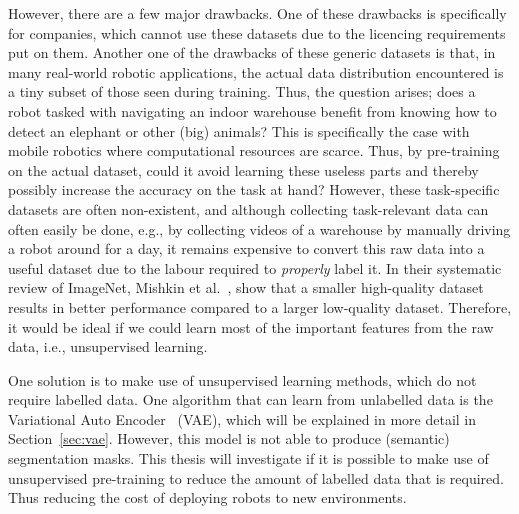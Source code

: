 However, there are a few major drawbacks. One of these drawbacks is specifically for companies, which cannot use these datasets due to the licencing requirements put on them. Another one of the drawbacks of these generic datasets is that, in many real-world robotic applications, the actual data distribution encountered is a tiny subset of those seen during training. Thus, the question arises; does a robot tasked with navigating an indoor warehouse benefit from knowing how to detect an elephant or other (big) animals? This is specifically the case with mobile robotics where computational resources are scarce. Thus, by pre-training on the actual dataset, could it avoid learning these useless parts and thereby possibly increase the accuracy on the task at hand? However, these task-specific datasets are often non-existent, and although collecting task-relevant data can often easily be done, e.g., by collecting videos of a warehouse by manually driving a robot around for a day, it remains expensive to convert this raw data into a useful dataset due to the labour required to \emph{properly} label it. In their systematic review of ImageNet, Mishkin et al.~\cite{MISHKIN201711}, show that a smaller high-quality dataset results in better performance compared to a larger low-quality dataset. Therefore, it would be ideal if we could learn most of the important features from the raw data, i.e., unsupervised learning.

One solution is to make use of unsupervised learning methods, which do not require labelled data. One algorithm that can learn from unlabelled data is the Variational Auto Encoder~\cite{kingma2014autoencodingvariationalbayes} (VAE), which will be explained in more detail in Section~\ref{sec:vae}. However, this model is not able to produce (semantic) segmentation masks. This thesis will investigate if it is possible to make use of unsupervised pre-training to reduce the amount of labelled data that is required. Thus reducing the cost of deploying robots to new environments.

